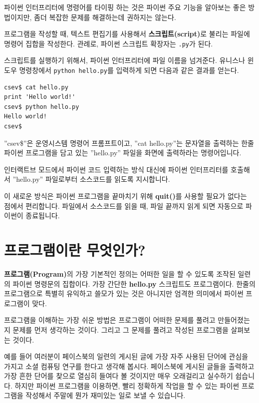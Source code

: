 파이썬 인터프리터에 명령어를 타이핑 하는 것은 파이썬 주요 기능을 알아보는 좋은 방법이지만,
좀더 복잡한 문제를 해결하는데 권하지는 않는다.

프로그램을 작성할 때, 
텍스트 편집기를 사용해서 {\bf 스크립트(script)}로 불리는 파일에 명령어 집합을 작성한다.
관례로, 파이썬 스크립트 확장자는 {\tt .py}가 된다. 


스크립트를 실행하기 위해서, 
파이썬 인터프리터에 파일 이름을 넘겨준다.
유니스나 윈도우 명령창에서 {\tt python hello.py}를 입력하게 되면 다음과 같은 결과를 얻는다.

\beforeverb
\begin{verbatim}
csev$ cat hello.py
print 'Hello world!'
csev$ python hello.py
Hello world!
csev$
\end{verbatim}
\afterverb
%

''csev\$''은 운영시스템 명령어 프롬프트이고, 
''cat hello.py''는 문자열을 출력하는 한줄 파이썬 프로그램을 담고 있는 ''hello.py'' 파일을 화면에 출력하라는 명령어입니다.

인터랙트브 모드에서 파이썬 코드 입력하는 방식 대신에 
파이썬 인터프리터를 호출해서 ''hello.py'' 파일로부터 소스코드를 읽도록 지시합니다.

이 새로운 방식은 파이썬 프로그램을 끝마치기 위해 {\bf quit()}를 사용할 필요가 없다는 점에서 편리합니다. 
파일에서 소스코드를 읽을 때, 파일 끝까지 읽게 되면 자동으로 파이썬이 종료됩니다.

\section{프로그램이란 무엇인가?}

{\bf 프로그램(Program)}의 가장 기본적인 정의는 어떠한 일을 할 수 있도록 조작된 일련의 파이썬 명령문의 집합이다. 가장 간단한 {\bf hello.py} 스크립트도 프로그램이다. 한줄의 프로그램으로 특별히 유익하고 쓸모가 있는 것은 아니지만 엄격한 의미에서 파이썬 프로그램이 맞다.

프로그램을 이해하는 가장 쉬운 방법은 프로그램이 어떠한 문제를 풀려고 만들어졌는지 문제를 먼저 생각하는 것이다. 그리고 그 문제를 풀려고 작성된 프로그램을 살펴보는 것이다.

예를 들어 여러분이 페이스북의 일련의 게시된 글에 가장 자주 사용된 단어에 관심을 가지고 소셜 컴퓨팅 연구를 한다고 생각해 봅시다. 페이스북에 게시된 글들을 출력하고 가장 흔한 단어를 찾으로 열심히 들여다 볼 것이지만 매우 오래걸리고 실수하기 쉽습니다. 하지만 파이썬 프로그램을 이용하면, 빨리 정확하게 작업을 할 수 있는 파이썬 프로그램을 작성해서 주말에 뭔가 재미있는 일로 보낼 수 있습니다.

